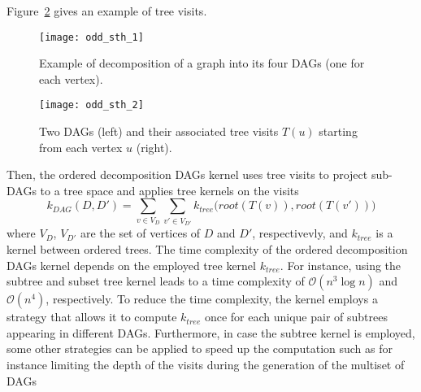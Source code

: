 \documentclass[twoside,11pt]{article}
\begin{document}
Figure~\ref{fig:odd_2} gives an example of tree visits.
\begin{figure}[t]
  \centering
  \texttt{[image: odd\_sth\_1]}
  \caption{Example of decomposition of a graph into its four DAGs (one for each vertex).}
  \label{fig:odd_1}
\end{figure}
\begin{figure}[t]
  \centering
  \texttt{[image: odd\_sth\_2]}
  \caption{Two DAGs (left) and their associated tree visits $T(u)$ starting from each vertex $u$ (right).}
  \label{fig:odd_2}
\end{figure}
Then, the ordered decomposition DAGs kernel uses tree visits to project sub-DAGs to a tree space and applies tree kernels on the visits
\begin{equation}
  k_{DAG}(D, D') = \sum_{v \in V_D} \sum_{v' \in V_{D'}} k_{tree} \big( root(T(v)),root(T(v')) \big)
\end{equation}
where $V_D$, $V_{D'}$ are the set of vertices of $D$ and $D'$, respectivevly, and $k_{tree}$ is a kernel between ordered trees.
The time complexity of the ordered decomposition DAGs kernel depends on the employed tree kernel $k_{tree}$.
For instance, using the subtree and subset tree kernel leads to a time complexity of $\mathcal{O}(n^3 \log n)$ and $\mathcal{O}(n^4)$, respectively.
To reduce the time complexity, the kernel employs a strategy that allows it to compute $k_{tree}$ once for each unique pair of subtrees appearing in different DAGs.
Furthermore, in case the subtree kernel is employed, some other strategies can be applied to speed up the computation such as for instance limiting the depth of the visits during the generation of the multiset of DAGs 
\end{document}
